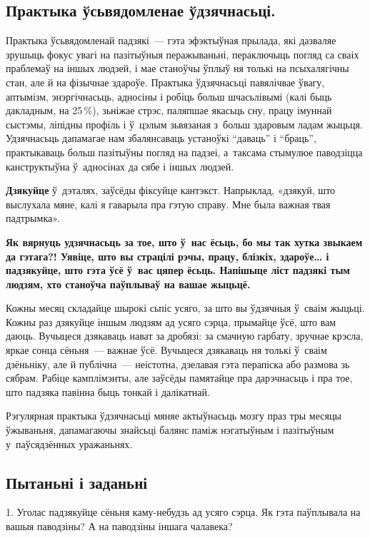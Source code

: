 \subsection*{Практыка ўсьвядомленае ўдзячнасьці.}

Практыка ўсьвядомленай падзякі~--- гэта эфэктыўная прылада, які дазваляе зрушыць фокус увагі на пазітыўныя перажываньні, пераключыць погляд са сваіх праблемаў на іншых людзей, і мае станоўчы ўплыў ня толькі на псыхалягічны стан, але й на фізычнае здароўе. Практыка ўдзячнасьці павялічвае ўвагу, аптымізм, энэргічнасьць, адносіны і робіць больш шчасьлівымі (калі быць дакладным, на 25\,\%), зьніжае стрэс, паляпшае якасьць сну, працу імуннай сыстэмы, ліпідны профіль і ў~цэлым зьвязаная з~больш здаровым ладам жыцьця. Удзячнасьць дапамагае нам збалянсаваць устаноўкі ``даваць'' і ``браць'', практыкаваць больш пазітыўны погляд на падзеі, а~таксама стымулюе паводзіцца канструктыўна ў~адносінах да сябе і іншых людзей.

\textbf{Дзякуйце} ў~дэталях, заўсёды фіксуйце кантэкст. Напрыклад, «дзякуй, што выслухала мяне, калі я гаварыла пра гэтую справу. Мне была важная твая падтрымка».

\textbf{Як вярнуць удзячнасьць за тое, што ў~нас ёсьць, бо мы так хутка звыкаем да гэтага?! Уявіце, што вы страцілі рэчы, працу, блізкіх, здароўе… і падзякуйце, што гэта ўсё ў~вас цяпер ёсьць. Напішыце ліст падзякі тым людзям, хто станоўча паўплываў на вашае жыцьцё.}

Кожны месяц складайце шырокі сьпіс усяго, за што вы ўдзячныя ў~сваім жыцьці. Кожны раз дзякуйце іншым людзям ад усяго сэрца, прымайце ўсё, што вам даюць. Вучыцеся дзякаваць нават за дробязі: за смачную гарбату, зручнае крэсла, яркае сонца сёньня~--- важнае ўсё. Вучыцеся дзякаваць ня толькі ў~сваім дзёньніку, але й публічна~--- неістотна, дзелавая гэта перапіска або размова зь сябрам. Рабіце камплімэнты, але заўсёды памятайце пра дарэчнасьць і пра тое, што падзяка павінна быць тонкай і далікатнай.

Рэгулярная практыка ўдзячнасьці мяняе актыўнасьць мозгу праз тры месяцы ўжываньня, дапамагаючы знайсьці балянс паміж нэгатыўным і пазітыўным у~паўсядзённых уражаньнях.

\subsection*{Пытаньні і заданьні}

1. Уголас падзякуйце сёньня каму-небудзь ад усяго сэрца. Як гэта паўплывала на вашыя паводзіны? А на паводзіны іншага чалавека?

